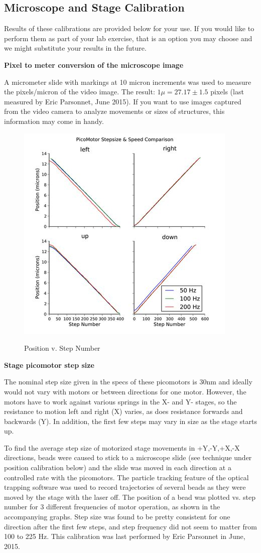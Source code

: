 \documentclass{../lab}
\begin{document}
\subsection{Microscope and Stage Calibration}

Results of these calibrations are provided below for your use. If you would like to perform them as part of your lab exercise, that is an option you may choose and we might substitute your results in the future.

\textbf{Pixel to meter conversion of the microscope image}

A micrometer slide with markings at 10 micron increments was used to measure the pixels/micron of the video image. The result: $1\mu = 27.17 \pm 1.5$ pixels (last measured by Eric Parsonnet, June 2015). If you want to use images captured from the video camera to analyze movements or sizes of structures, this information may come in handy.

\begin{figure}[h]
    \centering
    \href{http://experimentationlab.berkeley.edu/sites/default/files/images/400px-Stepsize-ayars.jpg}{\includegraphics[width=0.5\linewidth]{images/400px-Stepsize-ayars.jpg}}
    \caption{Position v. Step Number}
    \label{fig:400px-Stepsize-ayars}
\end{figure}

\textbf{Stage picomotor step size}

The nominal step size given in the specs of these picomotors is 30nm and ideally would not vary with motors or between directions for one motor. However, the motors have to work against various springs in the X- and Y- stages, so the resistance to motion left and right (X) varies, as does resistance forwards and backwards (Y). In addition, the first few steps may vary in size as the stage starts up.

To find the average step size of motorized stage movements in +Y,-Y,+X,-X directions, beads were caused to stick to a microscope slide (see technique under position calibration below) and the slide was moved in each direction at a controlled rate with the picomotors. The particle tracking feature of the optical trapping software was used to record trajectories of several beads as they were moved by the stage with the laser off. The position of a bead was plotted vs. step number for 3 different frequencies of motor operation, as shown in the accompanying graphs. Step size was found to be pretty consistent for one direction after the first few steps, and step frequency did not seem to matter from 100 to 225 Hz. This calibration was last performed by Eric Parsonnet in June, 2015.
\end{document}
